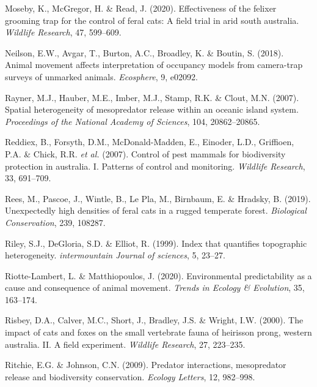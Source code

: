 \documentclass[]{elsarticle} %
\begin{document}
\leavevmode\hypertarget{ref-moseby2020effectiveness}{}%
Moseby, K., McGregor, H. \& Read, J. (2020). Effectiveness of the felixer grooming trap for the control of feral cats: A field trial in arid south australia. \emph{Wildlife Research}, 47, 599--609.

\leavevmode\hypertarget{ref-https:ux2fux2fdoi.orgux2f10.1002ux2fecs2.2092}{}%
Neilson, E.W., Avgar, T., Burton, A.C., Broadley, K. \& Boutin, S. (2018). Animal movement affects interpretation of occupancy models from camera-trap surveys of unmarked animals. \emph{Ecosphere}, 9, e02092.

\leavevmode\hypertarget{ref-rayner2007}{}%
Rayner, M.J., Hauber, M.E., Imber, M.J., Stamp, R.K. \& Clout, M.N. (2007). Spatial heterogeneity of mesopredator release within an oceanic island system. \emph{Proceedings of the National Academy of Sciences}, 104, 20862--20865.

\leavevmode\hypertarget{ref-reddiex2007}{}%
Reddiex, B., Forsyth, D.M., McDonald-Madden, E., Einoder, L.D., Griffioen, P.A. \& Chick, R.R. \emph{et al.} (2007). Control of pest mammals for biodiversity protection in australia. I. Patterns of control and monitoring. \emph{Wildlife Research}, 33, 691--709.

\leavevmode\hypertarget{ref-rees2019}{}%
Rees, M., Pascoe, J., Wintle, B., Le Pla, M., Birnbaum, E. \& Hradsky, B. (2019). Unexpectedly high densities of feral cats in a rugged temperate forest. \emph{Biological Conservation}, 239, 108287.

\leavevmode\hypertarget{ref-riley1999}{}%
Riley, S.J., DeGloria, S.D. \& Elliot, R. (1999). Index that quantifies topographic heterogeneity. \emph{intermountain Journal of sciences}, 5, 23--27.

\leavevmode\hypertarget{ref-RIOTTELAMBERT2020163}{}%
Riotte-Lambert, L. \& Matthiopoulos, J. (2020). Environmental predictability as a cause and consequence of animal movement. \emph{Trends in Ecology \& Evolution}, 35, 163--174.

\leavevmode\hypertarget{ref-risbey2000}{}%
Risbey, D.A., Calver, M.C., Short, J., Bradley, J.S. \& Wright, I.W. (2000). The impact of cats and foxes on the small vertebrate fauna of heirisson prong, western australia. II. A field experiment. \emph{Wildlife Research}, 27, 223--235.

\leavevmode\hypertarget{ref-ritchie2009predator}{}%
Ritchie, E.G. \& Johnson, C.N. (2009). Predator interactions, mesopredator release and biodiversity conservation. \emph{Ecology Letters}, 12, 982--998.
\end{document}
